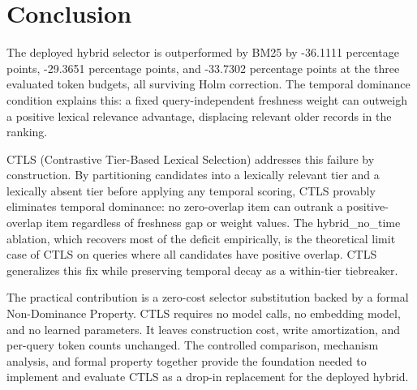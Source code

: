 \section{Conclusion}

\label{sec:conclusion}

The deployed hybrid selector is outperformed by BM25 by -36.1111 percentage points, -29.3651 percentage points, and -33.7302 percentage points at the three evaluated token budgets, all surviving Holm correction. The temporal dominance condition explains this: a fixed query-independent freshness weight can outweigh a positive lexical relevance advantage, displacing relevant older records in the ranking.

CTLS (Contrastive Tier-Based Lexical Selection) addresses this failure by construction. By partitioning candidates into a lexically relevant tier and a lexically absent tier before applying any temporal scoring, CTLS provably eliminates temporal dominance: no zero-overlap item can outrank a positive-overlap item regardless of freshness gap or weight values. The hybrid\_no\_time ablation, which recovers most of the deficit empirically, is the theoretical limit case of CTLS on queries where all candidates have positive overlap. CTLS generalizes this fix while preserving temporal decay as a within-tier tiebreaker.

The practical contribution is a zero-cost selector substitution backed by a formal Non-Dominance Property. CTLS requires no model calls, no embedding model, and no learned parameters. It leaves construction cost, write amortization, and per-query token counts unchanged. The controlled comparison, mechanism analysis, and formal property together provide the foundation needed to implement and evaluate CTLS as a drop-in replacement for the deployed hybrid.
